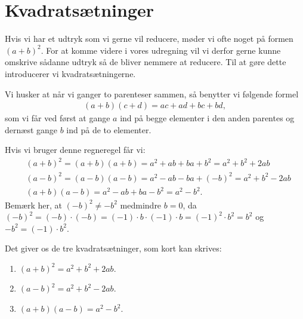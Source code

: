 \section{Kvadratsætninger}
\noindent Hvis vi har et udtryk som vi gerne vil reducere, møder vi ofte noget på formen $(a+b)^2$. For at komme videre i vores udregning vil vi derfor gerne kunne omskrive sådanne udtryk så de bliver nemmere at reducere. Til at gøre dette introducerer vi kvadratsætningerne.

Vi husker at når vi ganger to parenteser sammen, så benytter vi følgende formel
\begin{align*}
(a+b)(c+d)=ac+ad+bc+bd,
\end{align*}
som vi får ved først at gange $a$ ind på begge elementer i den anden parentes og dernæst gange $b$ ind på de to elementer.

Hvis vi bruger denne regneregel får vi:
\begin{align*}
&(a+b)^2=(a+b)(a+b)=a^2+ab+ba+b^2=a^2+b^2+2ab \\
&(a-b)^2=(a-b)(a-b)=a^2-ab-ba+(-b)^2 = a^2+b^2-2ab\\
&(a+b)(a-b)=a^2-ab+ba-b^2 = a^2-b^2.
\end{align*}
Bemærk her, at $(-b)^2 \neq -b^2$ medmindre $b=0$, da $(-b)^2 = (-b)\cdot (-b)=(-1)\cdot b \cdot (-1) \cdot b = (-1)^2 \cdot b^2 = b^2$ og $-b^2 = (-1) \cdot b^2$.

Det giver os de tre kvadratsætninger, som kort kan skrives:
\begin{enumerate}
\item $(a+b)^2=a^2+b^2+2ab$.
\item $(a-b)^2=a^2+b^2-2ab$.
\item $(a+b)(a-b)=a^2-b^2$.
\end{enumerate}

